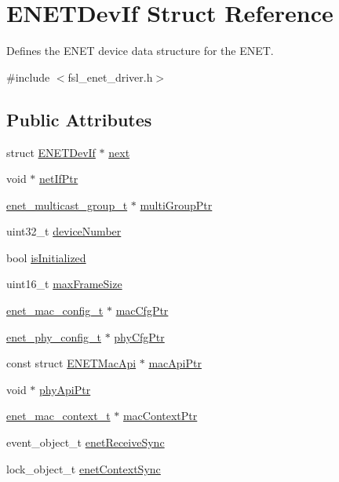 \hypertarget{structENETDevIf}{}\section{E\+N\+E\+T\+Dev\+If Struct Reference}
\label{structENETDevIf}


Defines the E\+N\+ET device data structure for the E\+N\+ET.  




{\ttfamily \#include $<$fsl\+\_\+enet\+\_\+driver.\+h$>$}

\subsection*{Public Attributes}
\begin{DoxyCompactItemize}
\item 
struct \hyperlink{structENETDevIf}{E\+N\+E\+T\+Dev\+If} $\ast$ \hyperlink{structENETDevIf_ab9a5c1191575dd02df163e36205fa5bd}{next}
\item 
void $\ast$ \hyperlink{structENETDevIf_a00a53ee84e7e89719ffcd7bd332c665f}{net\+If\+Ptr}
\item 
\hyperlink{group__enet__driver_ga0f85fe28ec946c36acd9856e9f70799a}{enet\+\_\+multicast\+\_\+group\+\_\+t} $\ast$ \hyperlink{structENETDevIf_ab01c067bf7f5d6b96698d4e1742de693}{multi\+Group\+Ptr}
\item 
uint32\+\_\+t \hyperlink{structENETDevIf_ad777399a38100a380730be25f370ed18}{device\+Number}
\item 
bool \hyperlink{structENETDevIf_adf1b2b7608495df389cb3a04d5481a96}{is\+Initialized}
\item 
uint16\+\_\+t \hyperlink{structENETDevIf_a4123bfba0f0a0b51273cc798daed3793}{max\+Frame\+Size}
\item 
\hyperlink{group__enet__driver_ga86d60926903993732e867674045719d9}{enet\+\_\+mac\+\_\+config\+\_\+t} $\ast$ \hyperlink{structENETDevIf_a55a61e5adc505a5f3ae4ae7dd995c89f}{mac\+Cfg\+Ptr}
\item 
\hyperlink{group__enet__driver_ga2ace9b034acffb5bb2bdca4b562e2c69}{enet\+\_\+phy\+\_\+config\+\_\+t} $\ast$ \hyperlink{structENETDevIf_a66a02cf3079a6c45e0acc8c518d88d79}{phy\+Cfg\+Ptr}
\item 
const struct \hyperlink{structENETMacApi}{E\+N\+E\+T\+Mac\+Api} $\ast$ \hyperlink{structENETDevIf_aa1cce413d5c8dfc5201968222a773d39}{mac\+Api\+Ptr}
\item 
void $\ast$ \hyperlink{structENETDevIf_ade848b993084a443534865584337743b}{phy\+Api\+Ptr}
\item 
\hyperlink{group__enet__driver_gad5e6d3da255845f7cea357156fafb319}{enet\+\_\+mac\+\_\+context\+\_\+t} $\ast$ \hyperlink{structENETDevIf_ae5122734e4a27b5030eda5e022ab765d}{mac\+Context\+Ptr}
\item 
event\+\_\+object\+\_\+t \hyperlink{structENETDevIf_a28d5d955e82f341500ba1bf8ed6649b0}{enet\+Receive\+Sync}
\item 
lock\+\_\+object\+\_\+t \hyperlink{structENETDevIf_accfc394f01c58f55defec44c80dd0d3e}{enet\+Context\+Sync}
\end{DoxyCompactItemize}


